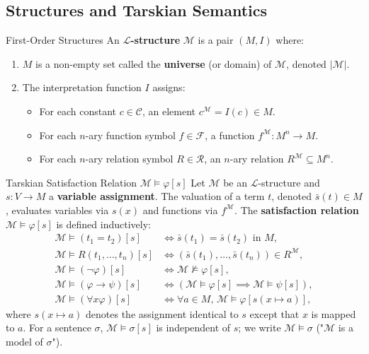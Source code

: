 \subsection{Structures and Tarskian Semantics}

\begin{definitionbox}{First-Order Structures}
An \textbf{$\mathcal{L}$-structure} $\mathcal{M}$ is a pair $(M, I)$ where:
\begin{enumerate}[leftmargin=1.4em,itemsep=2pt]
  \item $M$ is a non-empty set called the \textbf{universe} (or domain) of $\mathcal{M}$, denoted $|\mathcal{M}|$.
  \item The interpretation function $I$ assigns:
  \begin{itemize}[leftmargin=1.2em,itemsep=1pt]
    \item For each constant $c \in \mathcal{C}$, an element $c^\mathcal{M} = I(c) \in M$.
    \item For each $n$-ary function symbol $f \in \mathcal{F}$, a function $f^\mathcal{M}: M^n \to M$.
    \item For each $n$-ary relation symbol $R \in \mathcal{R}$, an $n$-ary relation $R^\mathcal{M} \subseteq M^n$.
  \end{itemize}
\end{enumerate}
\end{definitionbox}

\begin{definitionbox}{Tarskian Satisfaction Relation $\mathcal{M} \models \varphi [s]$}
Let $\mathcal{M}$ be an $\mathcal{L}$-structure and $s: V \to M$ a \textbf{variable assignment}.
The valuation of a term $t$, denoted $\bar{s}(t) \in M$, evaluates variables via $s(x)$ and functions via $f^\mathcal{M}$.
The \textbf{satisfaction relation} $\mathcal{M} \models \varphi [s]$ is defined inductively:
\begin{align*}
\mathcal{M} \models (t_1 = t_2)[s] &\iff \bar{s}(t_1) = \bar{s}(t_2) \text{ in } M, \\
\mathcal{M} \models R(t_1, \dots, t_n)[s] &\iff (\bar{s}(t_1), \dots, \bar{s}(t_n)) \in R^\mathcal{M}, \\
\mathcal{M} \models (\neg \varphi)[s] &\iff \mathcal{M} \not\models \varphi[s], \\
\mathcal{M} \models (\varphi \to \psi)[s] &\iff (\mathcal{M} \models \varphi[s] \implies \mathcal{M} \models \psi[s]), \\
\mathcal{M} \models (\forall x \varphi)[s] &\iff \forall a \in M,\, \mathcal{M} \models \varphi[s(x \mapsto a)],
\end{align*}
where $s(x \mapsto a)$ denotes the assignment identical to $s$ except that $x$ is mapped to $a$.
For a sentence $\sigma$, $\mathcal{M} \models \sigma [s]$ is independent of $s$; we write $\mathcal{M} \models \sigma$ ("$\mathcal{M}$ is a model of $\sigma$").
\end{definitionbox}

